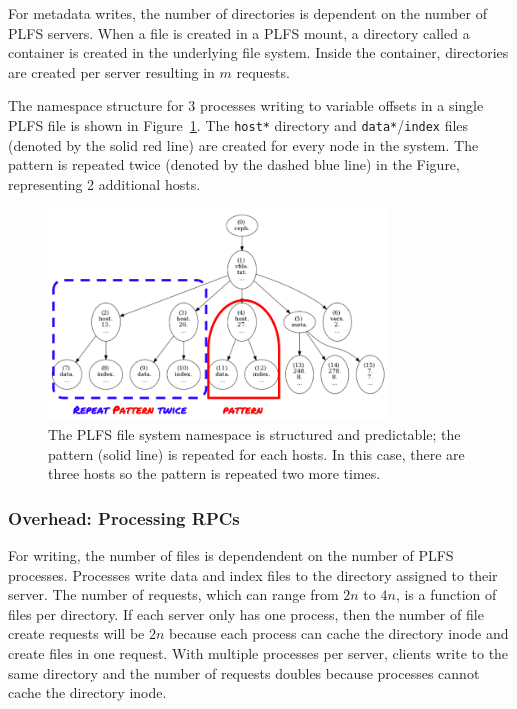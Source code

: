 For metadata writes, the number of directories is dependent on the number
of PLFS servers. When a file is created in a PLFS mount, a directory called a
container is created in the underlying file system. Inside the container,
directories are created per server resulting in \(m\) requests. 

The namespace structure for 3 processes writing to variable offsets in a single
PLFS file is shown in Figure~\ref{fig:tree_plfs}. The \texttt{host*} directory
and \texttt{data*}/\texttt{index} files (denoted by the solid red line) are
created for every node in the system. The pattern is repeated twice (denoted by
the dashed blue line) in the Figure, representing 2 additional hosts.

\begin{figure}[tb]
\centering
  \includegraphics[width=90mm]{figures/tree_plfs.png} 
  \caption{The PLFS file system namespace is structured and predictable; the
  pattern (solid line) is repeated for each hosts. In this case, there are three
  hosts so the pattern is repeated two more times. 
  }\label{fig:tree_plfs}
\end{figure}

\subsubsection{Overhead: Processing RPCs}

For writing, the number of files is dependendent on the number of PLFS
processes. Processes write data and index files to the directory assigned to
their server. The number of requests, which can range from \(2n\) to \(4n\), is
a function of files per directory.  If each server only has one process, then
the number of file create requests will be \(2n\) because each process can
cache the directory inode and create files in one request. With multiple
processes per server, clients write to the same directory and the number of
requests doubles because processes cannot cache the directory inode.

